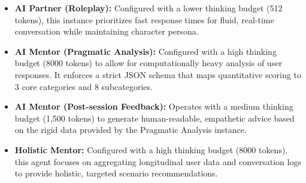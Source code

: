 \begin{itemize}
    \item \textbf{AI Partner (Roleplay):} Configured with a lower thinking budget (512 tokens), this instance prioritizes fast response times for fluid, real-time conversation while maintaining character persona.
    \item \textbf{AI Mentor (Pragmatic Analysis):} Configured with a high thinking budget (8000 tokens) to allow for computationally heavy analysis of user responses. It enforces a strict JSON schema that maps quantitative scoring to 3 core categories and 8 subcategories.
    \item \textbf{AI Mentor (Post-session Feedback):} Operates with a medium thinking budget (1,500 tokens) to generate human-readable, empathetic advice based on the rigid data provided by the Pragmatic Analysis instance.
    \item \textbf{Holistic Mentor:} Configured with a high thinking budget (8000 tokens), this agent focuses on aggregating longitudinal user data and conversation logs to provide holistic, targeted scenario recommendations.
\end{itemize}

